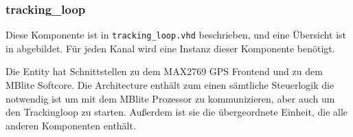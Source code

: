 \subsubsection{tracking\_loop}
Diese Komponente ist in \lstinline$tracking_loop.vhd$ beschrieben, und eine Übersicht ist in  abgebildet. Für jeden Kanal wird eine Instanz dieser Komponente benötigt.

Die Entity hat Schnittstellen zu dem MAX2769 GPS Frontend und zu dem MBlite Softcore. Die Architecture enthält zum einen sämtliche Steuerlogik die notwendig ist um mit dem MBlite Prozessor zu kommunizieren, aber auch um den Trackingloop zu starten. Außerdem ist sie die übergeordnete Einheit, die alle anderen Komponenten enthält.

